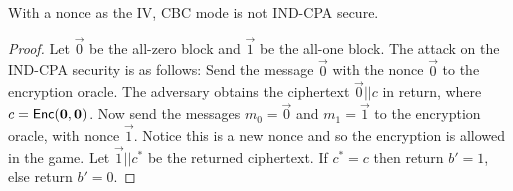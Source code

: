 

\begin{theorem} \label{thm:nonce_cbc_is_nt_ind_cpa}
  With a nonce as the IV, CBC mode is not IND-CPA secure.
\end{theorem}

\begin{proof}
  Let $\vec{0}$ be the all-zero block and $\vec{1}$ be the all-one block. The
  attack on the \textsf{IND-CPA} security is as follows:
  Send the message $\vec{0}$ with the nonce $\vec{0}$ to the
  encryption oracle. The adversary obtains the ciphertext $\vec{0}||c$ in
  return, where $c = \textsf{Enc}(\mathbf{0}, \mathbf{0})$. Now send the messages
  $m_0 = \vec{0}$ and $m_1 = \vec{1}$ to the encryption oracle, with nonce
  $\vec{1}$. Notice this is a new nonce and so the encryption is allowed in the
  game. Let $\vec{1}||c^*$ be the returned ciphertext. If $c^* = c$ then return
  $b' = 1$, else return $b' = 0$.
\end{proof}
